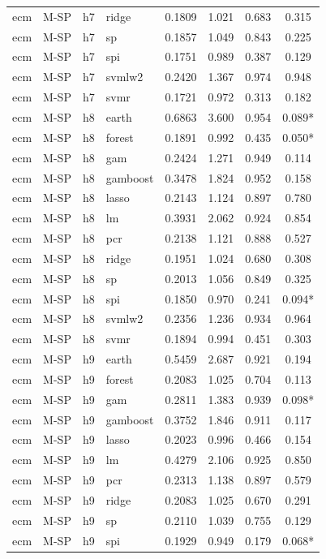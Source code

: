 \begin{ThreePartTable}
\begin{longtable}[t]{llclcccc}
ecm & M-SP & h7 & ridge & 0.1809 & 1.021 & 0.683 & 0.315\\
ecm & M-SP & h7 & sp & 0.1857 & 1.049 & 0.843 & 0.225\\
ecm & M-SP & h7 & spi & 0.1751 & 0.989 & 0.387 & 0.129\\
ecm & M-SP & h7 & svmlw2 & 0.2420 & 1.367 & 0.974 & 0.948\\
ecm & M-SP & h7 & svmr & 0.1721 & 0.972 & 0.313 & 0.182\\
\addlinespace
ecm & M-SP & h8 & earth & 0.6863 & 3.600 & 0.954 & 0.089*\\
ecm & M-SP & h8 & forest & 0.1891 & 0.992 & 0.435 & 0.050*\\
ecm & M-SP & h8 & gam & 0.2424 & 1.271 & 0.949 & 0.114\\
ecm & M-SP & h8 & gamboost & 0.3478 & 1.824 & 0.952 & 0.158\\
ecm & M-SP & h8 & lasso & 0.2143 & 1.124 & 0.897 & 0.780\\
ecm & M-SP & h8 & lm & 0.3931 & 2.062 & 0.924 & 0.854\\
ecm & M-SP & h8 & pcr & 0.2138 & 1.121 & 0.888 & 0.527\\
ecm & M-SP & h8 & ridge & 0.1951 & 1.024 & 0.680 & 0.308\\
ecm & M-SP & h8 & sp & 0.2013 & 1.056 & 0.849 & 0.325\\
ecm & M-SP & h8 & spi & 0.1850 & 0.970 & 0.241 & 0.094*\\
ecm & M-SP & h8 & svmlw2 & 0.2356 & 1.236 & 0.934 & 0.964\\
ecm & M-SP & h8 & svmr & 0.1894 & 0.994 & 0.451 & 0.303\\
\addlinespace
ecm & M-SP & h9 & earth & 0.5459 & 2.687 & 0.921 & 0.194\\
ecm & M-SP & h9 & forest & 0.2083 & 1.025 & 0.704 & 0.113\\
ecm & M-SP & h9 & gam & 0.2811 & 1.383 & 0.939 & 0.098*\\
ecm & M-SP & h9 & gamboost & 0.3752 & 1.846 & 0.911 & 0.117\\
ecm & M-SP & h9 & lasso & 0.2023 & 0.996 & 0.466 & 0.154\\
ecm & M-SP & h9 & lm & 0.4279 & 2.106 & 0.925 & 0.850\\
ecm & M-SP & h9 & pcr & 0.2313 & 1.138 & 0.897 & 0.579\\
ecm & M-SP & h9 & ridge & 0.2083 & 1.025 & 0.670 & 0.291\\
ecm & M-SP & h9 & sp & 0.2110 & 1.039 & 0.755 & 0.129\\
ecm & M-SP & h9 & spi & 0.1929 & 0.949 & 0.179 & 0.068*\\

\end{longtable}
\end{ThreePartTable}
